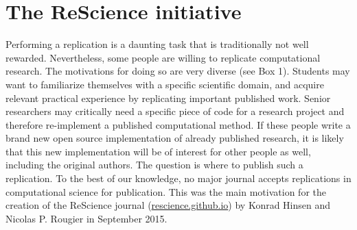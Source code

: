 \documentclass[a4paper,10pt, twocolumn]{article}
\begin{document}
\section*{The ReScience initiative}

Performing a replication is a daunting task that is traditionally not well
rewarded. Nevertheless, some people are willing to replicate computational
research. The motivations for doing so are very diverse (see Box 1). Students
may want to familiarize themselves with a specific scientific domain, and
acquire relevant practical experience by replicating important published
work. Senior researchers may critically need a specific piece of code for a
research project and therefore re-implement a published computational
method. If these people write a brand new open source implementation of already
published research, it is likely that this new implementation will be of
interest for other people as well, including the original authors. The question
is where to publish such a replication. To the best of our knowledge, no major
journal accepts replications in computational science for publication. This was
the main motivation for the creation of the ReScience journal
(\href{https://rescience.github.io}{rescience.github.io}) by Konrad Hinsen and
Nicolas P. Rougier in September 2015.\\
\end{document}
